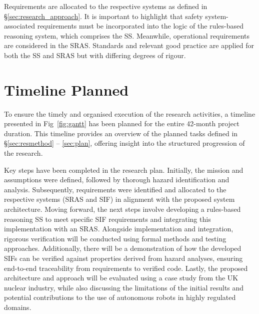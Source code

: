 \documentclass[conference]{IEEEtran}
\newcommand{\marienote}[1]{\todo[color=orange!65,inline]{Marie: #1}}
\begin{document}
Requirements are allocated to the respective systems as defined in \S\ref{sec:research_approach}. It is important to highlight that safety system-associated requirements must be incorporated into the logic of the rules-based reasoning system, which comprises the SS. Meanwhile, operational requirements are considered in the SRAS. Standards and relevant good practice are applied for both the SS and SRAS but with differing degrees of rigour.



\section{Timeline Planned}

To ensure the timely and organised execution of the research activities, a timeline presented in Fig~\ref{fig:gantt} has been planned for the entire 42-month project duration. This timeline provides an overview of the planned tasks defined in \S \ref{sec:resmethod} -- \ref{sec:plan}, offering insight into the structured progression of the research.

Key steps have been completed in the research plan. Initially, the mission and assumptions were defined, followed by thorough hazard identification and analysis. Subsequently, requirements were identified and allocated to the respective systems (SRAS and SIF) in alignment with the proposed system architecture. Moving forward, the next steps involve developing a rules-based reasoning SS to meet specific SIF requirements and integrating this implementation with an SRAS. Alongside implementation and integration, rigorous verification will be conducted using formal methods and testing approaches. Additionally, there will be a demonstration of how the developed SIFs can be verified against properties derived from hazard analyses, ensuring end-to-end traceability from requirements to verified code. Lastly, the proposed architecture and approach will be evaluated using a case study from the UK nuclear industry, while also discussing the limitations of the initial results and potential contributions to the use of autonomous robots in highly regulated domains.
\end{document}
